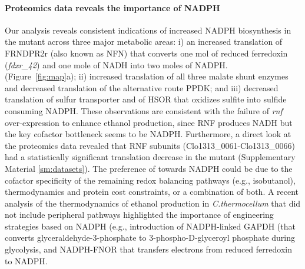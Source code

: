 \paragraph{Proteomics data reveals the importance of NADPH}
Our analysis reveals consistent indications of increased NADPH biosynthesis in the  mutant across three major metabolic areas: i) an increased translation of FRNDPR2r (also known as NFN) that converts one mol of reduced ferredoxin (\textit{fdxr\_42}) and one mole of NADH into two moles of NADPH.
(Figure~\ref{fig:map}a);
ii) increased translation of all three malate shunt enzymes and decreased translation of the alternative route PPDK; %
and iii) decreased translation of sulfur transporter and of HSOR that oxidizes sulfite into sulfide consuming NADPH.
These observations are consistent with the failure of \textit{rnf} over-expression to enhance ethanol production\citep{lo2017}, since RNF produces NADH but the key cofactor bottleneck seems to be NADPH. Furthermore, a direct look at the proteomics data revealed that RNF subunits (Clo1313\_0061-Clo1313\_0066) had a statistically significant translation decrease in the mutant (Supplementary Material \ref{sm:datasets}).
The preference of  towards NADPH could be due to the cofactor specificity of the remaining redox balancing pathways (e.g., isobutanol), thermodynamics and protein cost constraints, or a combination of both. A recent analysis of the thermodynamics of ethanol production in \textit{C.thermocellum} that did not include peripheral pathways highlighted the importance of engineering strategies based on NADPH (e.g., introduction of NADPH-linked GAPDH (that converts glyceraldehyde-3-phosphate to 3-phospho-D-glyceroyl phosphate during glycolysis, and NADPH-FNOR that transfers electrons from reduced ferredoxin to NADPH.



